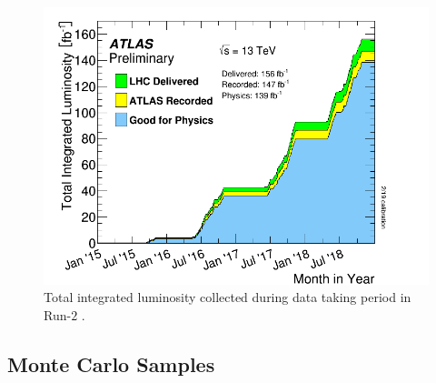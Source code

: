 \begin{figure}[!htb]
\centering
\includegraphics[width=.8\linewidth]{figures/AnalysisOverview/IntegratedLumiRun2.pdf}  
  \caption{Total integrated luminosity collected during data taking period in Run-$2$ \cite{ATLASRun2DataTaking}. }
\label{fig:InstLuminosity}
\end{figure}

\subsection{Monte Carlo Samples }
\label{subsec:MCSamples}

